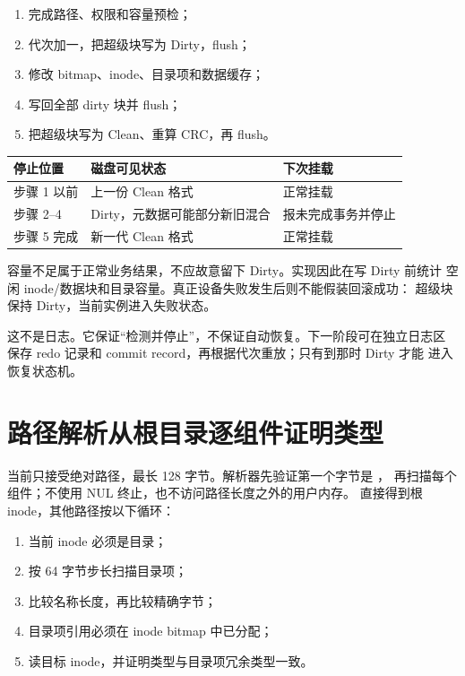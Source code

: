 \begin{enumerate}[label=\arabic*.]
  \item 完成路径、权限和容量预检；
  \item 代次加一，把超级块写为 Dirty，flush；
  \item 修改 bitmap、inode、目录项和数据缓存；
  \item {} 写回全部 dirty 块并 flush；
  \item 把超级块写为 Clean、重算 CRC，再 flush。
\end{enumerate}

\begin{longtable}{L{0.21\textwidth}L{0.28\textwidth}L{0.39\textwidth}}
\toprule
停止位置 & 磁盘可见状态 & 下次挂载\\
\midrule
步骤 1 以前 & 上一份 Clean 格式 & 正常挂载\\
步骤 2--4 & Dirty，元数据可能部分新旧混合 & 报未完成事务并停止\\
步骤 5 完成 & 新一代 Clean 格式 & 正常挂载\\
\bottomrule
\end{longtable}

容量不足属于正常业务结果，不应故意留下 Dirty。实现因此在写 Dirty 前统计
空闲 inode/数据块和目录容量。真正设备失败发生后则不能假装回滚成功：
超级块保持 Dirty，当前实例进入失败状态。

这不是日志。它保证“检测并停止”，不保证自动恢复。下一阶段可在独立日志区
保存 redo 记录和 commit record，再根据代次重放；只有到那时 Dirty 才能
进入恢复状态机。

\section{路径解析从根目录逐组件证明类型}

当前只接受绝对路径，最长 128 字节。解析器先验证第一个字节是 \code{/}，
再扫描每个组件；不使用 NUL 终止，也不访问路径长度之外的用户内存。
\code{/} 直接得到根 inode，其他路径按以下循环：

\begin{enumerate}[label=\arabic*.]
  \item 当前 inode 必须是目录；
  \item 按 64 字节步长扫描目录项；
  \item 比较名称长度，再比较精确字节；
  \item 目录项引用必须在 inode bitmap 中已分配；
  \item 读目标 inode，并证明类型与目录项冗余类型一致。
\end{enumerate}

